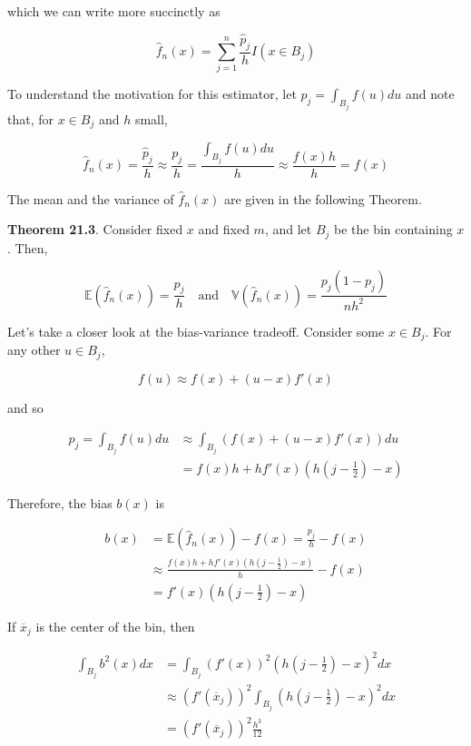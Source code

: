 which we can write more succinctly as

\[ \hat{f}_n(x) = \sum_{j=1}^n \frac{\hat{p}_j}{h} I(x \in B_j) \]

To understand the motivation for this estimator, let
\(p_j = \int_{B_j} f(u) du\) and note that, for \(x \in B_j\) and \(h\)
small,

\[ \hat{f}_n(x) = \frac{\hat{p}_j}{h} \approx \frac{p_j}{h} = \frac{\int_{B_j} f(u) du}{h} \approx \frac{f(x) h}{h} = f(x) \]

The mean and the variance of \(\hat{f}_n(x)\) are given in the following
Theorem.

\textbf{Theorem 21.3}. Consider fixed \(x\) and fixed \(m\), and let
\(B_j\) be the bin containing \(x\). Then,

\[ 
\mathbb{E}(\hat{f}_n(x)) = \frac{p_j}{h} 
\quad \text{and} \quad
\mathbb{V}(\hat{f}_n(x)) = \frac{p_j (1 - p_j)}{nh^2}
\]

Let's take a closer look at the bias-variance tradeoff. Consider some
\(x \in B_j\). For any other \(u \in B_j\),

\[ f(u) \approx f(x) + (u - x) f'(x) \]

and so

\[ 
\begin{align}
p_j = \int_{B_j} f(u) du &\approx \int_{B_j} (f(x) + (u - x) f'(x)) du \\
&= f(x) h + h f'(x) \left(h \left(j - \frac{1}{2} \right) - x \right)
\end{align}
\]

Therefore, the bias \(b(x)\) is

\[
\begin{align}
b(x) &= \mathbb{E}(\hat{f}_n(x)) - f(x) = \frac{p_j}{h} - f(x) \\
&\approx \frac{f(x) h + h f'(x) \left(h \left(j - \frac{1}{2} \right) - x \right)}{h} - f(x) \\
&= f'(x) \left(h \left(j - \frac{1}{2} \right) - x \right)
\end{align}
\]

If \(\overline{x}_j\) is the center of the bin, then

\[
\begin{align}
\int_{B_j} b^2(x) dx &= \int_{B_j} (f'(x))^2 \left(h \left(j - \frac{1}{2} \right) - x \right)^2 dx \\
&\approx (f'(\overline{x}_j))^2 \int_{B_j} \left(h \left(j - \frac{1}{2} \right) - x \right)^2 dx \\
&= (f'(\overline{x}_j))^2 \frac{h^3}{12}
\end{align}
\]

